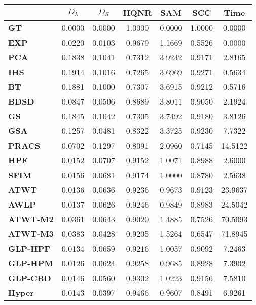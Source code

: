 \begin{tabular}{|l|c|c|c|c|c|c|}
\hline
&\textbf{$D_{\lambda}$}&\textbf{$D_{S}$}&\textbf{HQNR}&\textbf{SAM}&\textbf{SCC}&\textbf{Time}\\\hline
\textbf{GT}&0.0000&0.0000&1.0000&0.0000&1.0000&0.0000\\\hline
\textbf{EXP}&0.0220&0.0103&0.9679&1.1669&0.5526&0.0000\\\hline
\textbf{PCA}&0.1838&0.1041&0.7312&3.9242&0.9171&2.8165\\\hline
\textbf{IHS}&0.1914&0.1016&0.7265&3.6969&0.9271&0.5634\\\hline
\textbf{BT}&0.1881&0.1000&0.7307&3.6915&0.9212&0.5716\\\hline
\textbf{BDSD}&0.0847&0.0506&0.8689&3.8011&0.9050&2.1924\\\hline
\textbf{GS}&0.1845&0.1042&0.7305&3.7492&0.9180&3.8126\\\hline
\textbf{GSA}&0.1257&0.0481&0.8322&3.3725&0.9230&7.7322\\\hline
\textbf{PRACS}&0.0702&0.1297&0.8091&2.0960&0.7145&14.5122\\\hline
\textbf{HPF}&0.0152&0.0707&0.9152&1.0071&0.8988&2.6000\\\hline
\textbf{SFIM}&0.0156&0.0681&0.9174&1.0000&0.8780&2.5638\\\hline
\textbf{ATWT}&0.0136&0.0636&0.9236&0.9673&0.9123&23.9637\\\hline
\textbf{AWLP}&0.0137&0.0626&0.9246&0.9849&0.8983&24.5042\\\hline
\textbf{ATWT-M2}&0.0361&0.0643&0.9020&1.4885&0.7526&70.5093\\\hline
\textbf{ATWT-M3}&0.0383&0.0428&0.9205&1.5264&0.6547&71.8945\\\hline
\textbf{GLP-HPF}&0.0134&0.0659&0.9216&1.0057&0.9092&7.2463\\\hline
\textbf{GLP-HPM}&0.0126&0.0624&0.9258&0.9685&0.8928&7.3902\\\hline
\textbf{GLP-CBD}&0.0146&0.0560&0.9302&1.0223&0.9156&7.5810\\\hline
\textbf{Hyper}&0.0143&0.0397&0.9466&0.9607&0.8491&6.9261\\\hline
\end{tabular}
